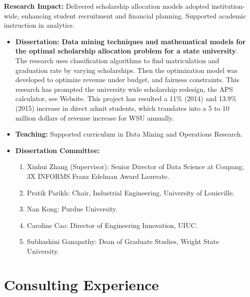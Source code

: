 \documentclass[12pt,a4paper,sans]{moderncv}
\begin{document}
\bigskip


\textbf{Research Impact:} Delivered scholarship allocation models adopted institution-wide, enhancing student recruitment and financial planning. Supported academic instruction in analytics.
\begin{itemize}
  \item \textbf{Dissertation: Data mining techniques and mathematical models for the optimal scholarship
allocation problem for a state university}. The research uses classification algorithms to find matriculation
and graduation rate by varying scholarships. Then the optimization model was developed to optimize revenue
under budget, and fairness constraints. This research has prompted the university wide scholarship redesign,
the APS calculator, see Website. This project has resulted a 11\% (2014) and 13.9\% (2015) increase in direct
admit students, which translates into a 5 to 10 million dollars of revenue increase for WSU annually. 
 \item \textbf{Teaching:} Supported curriculum in Data Mining and Operations Research.
  \item \textbf{Dissertation Committee:}
  \begin{enumerate}
    \item Xinhui Zhang (Supervisor): Senior Director of Data Science at Coupang; 3X INFORMS Franz Edelman Award Laureate.
    \item Pratik Parikh: Chair, Industrial Engineering, University of Louisville.
    \item Nan Kong: Purdue University.
    \item Caroline Cao: Director of Engineering Innovation, UIUC.
    \item Subhashini Ganapathy: Dean of Graduate Studies, Wright State University.
  \end{enumerate}
\end{itemize}

\section{Consulting Experience}
\end{document}
